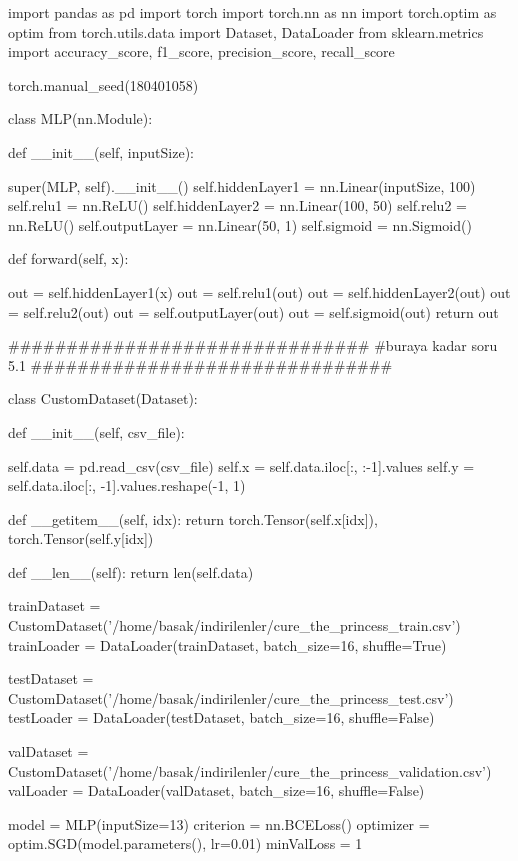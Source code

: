 \documentclass[11pt]{article}
\begin{document}
\begin{python}
import pandas as pd
import torch
import torch.nn as nn
import torch.optim as optim
from torch.utils.data import Dataset, DataLoader
from sklearn.metrics import accuracy_score, f1_score, precision_score, recall_score

torch.manual_seed(180401058)

class MLP(nn.Module):

    def __init__(self, inputSize):

        super(MLP, self).__init__()
        self.hiddenLayer1 = nn.Linear(inputSize, 100)
        self.relu1 = nn.ReLU()
        self.hiddenLayer2 = nn.Linear(100, 50)
        self.relu2 = nn.ReLU()
        self.outputLayer = nn.Linear(50, 1)
        self.sigmoid = nn.Sigmoid()

    def forward(self, x):

        out = self.hiddenLayer1(x)
        out = self.relu1(out)
        out = self.hiddenLayer2(out)
        out = self.relu2(out)
        out = self.outputLayer(out)
        out = self.sigmoid(out)
        return out

###############################
#buraya kadar soru 5.1
###############################

class CustomDataset(Dataset):

    def __init__(self, csv_file):

        self.data = pd.read_csv(csv_file)
        self.x = self.data.iloc[:, :-1].values
        self.y = self.data.iloc[:, -1].values.reshape(-1, 1)

    def __getitem__(self, idx):
        return torch.Tensor(self.x[idx]), torch.Tensor(self.y[idx])

    def __len__(self):
        return len(self.data)


trainDataset = CustomDataset('/home/basak/indirilenler/cure_the_princess_train.csv')
trainLoader = DataLoader(trainDataset, batch_size=16, shuffle=True)

testDataset = CustomDataset('/home/basak/indirilenler/cure_the_princess_test.csv')
testLoader = DataLoader(testDataset, batch_size=16, shuffle=False)

valDataset = CustomDataset('/home/basak/indirilenler/cure_the_princess_validation.csv')
valLoader = DataLoader(valDataset, batch_size=16, shuffle=False)

model = MLP(inputSize=13)
criterion = nn.BCELoss()
optimizer = optim.SGD(model.parameters(), lr=0.01)
minValLoss = 1


\end{python}
\end{document}
